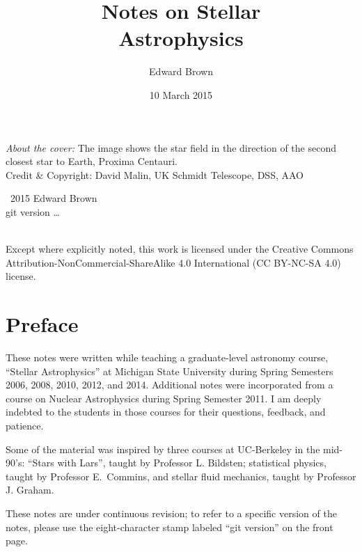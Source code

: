 \documentclass[nofonts,ls]{tufte-book}
\title{Notes on Stellar\\Astrophysics}
\author{Edward Brown}
\date{10 March 2015}
\begin{document}
\frontmatter
{}
\maketitle
\newpage
\begin{fullwidth}
\thispagestyle{empty}

\vspace{3\baselineskip}
\noindent \textit{About the cover:} The image shows the star field in the direction of the second closest star to Earth, Proxima Centauri.\\
\noindent Credit \& Copyright: David Malin, UK Schmidt Telescope, DSS, AAO

\vfill
\noindent \ccCopy\ 2015 Edward Brown\\
\noindent git version \ldots

\vspace{3\baselineskip}
\noindent \ccbyncsa \\
\noindent Except where explicitly noted, this work is licensed under the Creative Commons
Attribution-NonCommercial-ShareAlike 4.0 International (CC BY-NC-SA
4.0) license.

\end{fullwidth}

\newpage
\section*{Preface}
These notes were written while teaching a graduate-level astronomy course, ``Stellar Astrophysics'' at Michigan State University during Spring Semesters 2006, 2008, 2010, 2012, and 2014.  Additional notes were incorporated from a course on Nuclear Astrophysics during Spring Semester 2011. I am deeply indebted to the students in those courses for their questions, feedback, and patience.

Some of the material was inspired by three courses at UC-Berkeley in the mid-90's: ``Stars with Lars'', taught by Professor L. Bildsten; statistical physics, taught by Professor E.~Commins, and stellar fluid mechanics, taught by Professor J. Graham.

These notes are under continuous revision; to refer to a specific version of the notes, please use the eight-character stamp labeled ``git version'' on the front page.

\tableofcontents
\listoffigures

\mainmatter

















\appendix


\backmatter


\end{document}
